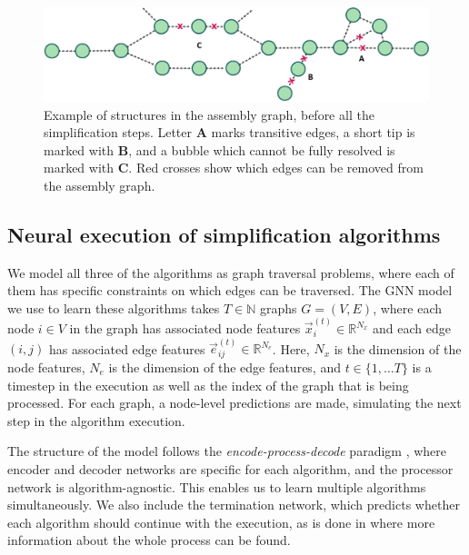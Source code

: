 \documentclass{article}
\begin{document}
\begin{figure}
  \centering
  \includegraphics[width=0.9\linewidth]{figures/assembly_graph.png}
  \caption{Example of structures in the assembly graph, before all the simplification steps. Letter \textbf{A} marks transitive edges, a short tip is marked with \textbf{B}, and a bubble which cannot be fully resolved is marked with \textbf{C}. Red crosses show which edges can be removed from the assembly graph.}
  \label{fig:graph}
\end{figure}

\subsection{Neural execution of simplification algorithms}

We model all three of the algorithms as graph traversal problems, where each of them has specific constraints on which edges can be traversed. The GNN model we use to learn these algorithms takes $T \in \mathbb{N}$ graphs $G = (V, E)$, where each node  $i \in V$ in the graph has associated node features $\vec{x}_i^{(t)} \in \mathbb{R}^{N_x}$ and each edge $(i, j)$ has associated edge features $\vec{e}_{ij}^{(t)} \in \mathbb{R}^{N_e}$. Here,  $N_x$ is the dimension of the node features, $N_e$ is the dimension of the edge features, and $t \in \{1, \dots T \}$ is a timestep in the execution as well as the index of the graph that is being processed. For each graph, a node-level predictions are made, simulating the next step in the algorithm execution.

The structure of the model follows the \textit{encode-process-decode} paradigm \cite{hamrick2018relational}, where encoder and decoder networks are specific for each algorithm, and the processor network is algorithm-agnostic. This enables us to learn multiple algorithms simultaneously. We also include the termination network, which predicts whether each algorithm should continue with the execution, as is done in \cite{velivckovic2019neural} where more information about the whole process can be found.
\end{document}
